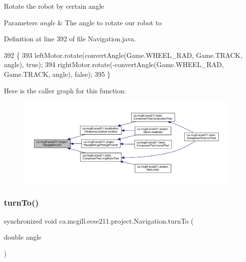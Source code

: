 Rotate the robot by certain angle


\begin{DoxyParams}{Parameters}
{\em angle} & The angle to rotate our robot to \\
\hline
\end{DoxyParams}


Definition at line 392 of file Navigation.\+java.


\begin{DoxyCode}
392                               \{
393     leftMotor.rotate(convertAngle(Game.WHEEL\_RAD, Game.TRACK, angle), \textcolor{keyword}{true});
394     rightMotor.rotate(-convertAngle(Game.WHEEL\_RAD, Game.TRACK, angle), \textcolor{keyword}{false});
395   \}
\end{DoxyCode}
Here is the caller graph for this function\+:
\nopagebreak
\begin{figure}[H]
\begin{center}
\leavevmode
\includegraphics[width=350pt]{classca_1_1mcgill_1_1ecse211_1_1project_1_1_navigation_ad74286ad36d333bfaf57661837457b76_icgraph}
\end{center}
\end{figure}
\mbox{\label{classca_1_1mcgill_1_1ecse211_1_1project_1_1_navigation_a3bbe0645f2b3b3d0986b4a707fb5a00c}} 
\subsubsection{\texorpdfstring{turn\+To()}{turnTo()}}
{\footnotesize\ttfamily synchronized void ca.\+mcgill.\+ecse211.\+project.\+Navigation.\+turn\+To (\begin{DoxyParamCaption}\item[{double}]{angle }\end{DoxyParamCaption})}

